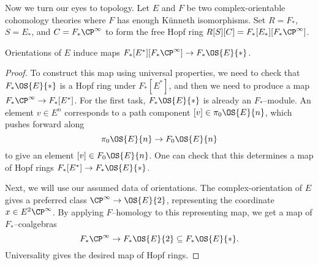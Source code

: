 Now we turn our eyes to topology.  Let $E$ and $F$ be two complex-orientable cohomology theories where $F$ has enough K\"unneth isomorphisms.  Set $R = F_*$, $S = E_*$, and $C = F_* \CP^\infty$ to form the free Hopf ring $R[S][C] = F_*[E_*][F_* \CP^\infty]$.
\begin{lemma}
Orientations of $E$ induce maps $F_*[E^*][F_* \CP^\infty] \to F_* \OS{E}{*}$. 
\end{lemma}
\begin{proof}
To construct this map using universal properties, we need to check that $F_* \OS{E}{*}$ is a Hopf ring under $F_*[E^*]$, and then we need to produce a map $F_* \CP^\infty \to F_*[E^*]$.  For the first task, $F_* \OS{E}{*}$ is already an $F_*$--module.  An element $v \in E^n$  corresponds to a path component $[v] \in \pi_0 \OS{E}{n}$, which pushes forward along \[\pi_0 \OS{E}{n} \to F_0 \OS{E}{n}\] to give an element $[v] \in F_0 \OS{E}{n}$.  One can check that this determines a map of Hopf rings $F_*[E^*] \to F_* \OS{E}{*}$.

Next, we will use our assumed data of orientations.  The complex-orientation of $E$ gives a preferred class $\CP^\infty \to \OS{E}{2}$, representing the coordinate $x \in E^2 \CP^\infty$.  By applying $F$--homology to this representing map, we get a map of $F_*$--coalgebras \[F_* \CP^\infty \to F_* \OS{E}{2} \subseteq F_* \OS{E}{*}.\]  Universality gives the desired map of Hopf rings.
\end{proof}

